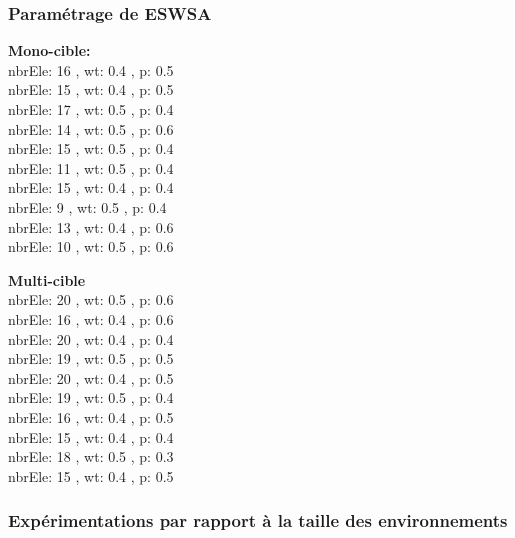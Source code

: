 \subsubsection{Paramétrage de ESWSA}
\noindent
\begin{minipage}[t]{0.55\textwidth}
	\textbf{Mono-cible:} \\
	 nbrEle: 16 , wt: 0.4 , p: 0.5\\
	 nbrEle: 15 , wt: 0.4 , p: 0.5\\
	 nbrEle: 17 , wt: 0.5 , p: 0.4\\
	 nbrEle: 14 , wt: 0.5 , p: 0.6\\
	 nbrEle: 15 , wt: 0.5 , p: 0.4\\
	 nbrEle: 11 , wt: 0.5 , p: 0.4\\
	 nbrEle: 15 , wt: 0.4 , p: 0.4\\
	 nbrEle: 9 , wt: 0.5 ,  p: 0.4\\
	 nbrEle: 13 , wt: 0.4 , p: 0.6\\
	 nbrEle: 10 , wt: 0.5 , p: 0.6\\
	
\end{minipage}\hfill
\hspace{0.2cm}
\begin{minipage}[t]{0.55\textwidth}
	\textbf{Multi-cible}\\
	 nbrEle: 20 , wt: 0.5 , p: 0.6\\
	 nbrEle: 16 , wt: 0.4 , p: 0.6\\
	 nbrEle: 20 , wt: 0.4 , p: 0.4\\
	 nbrEle: 19 , wt: 0.5 , p: 0.5\\
	 nbrEle: 20 , wt: 0.4 , p: 0.5\\
	 nbrEle: 19 , wt: 0.5 , p: 0.4\\
	 nbrEle: 16 , wt: 0.4 , p: 0.5\\
	 nbrEle: 15 , wt: 0.4 , p: 0.4\\
	 nbrEle: 18 , wt: 0.5 , p: 0.3\\
	 nbrEle: 15 , wt: 0.4 , p: 0.5\\

\end{minipage}\hfill


\subsubsection{Expérimentations par rapport à la taille des environnements}
